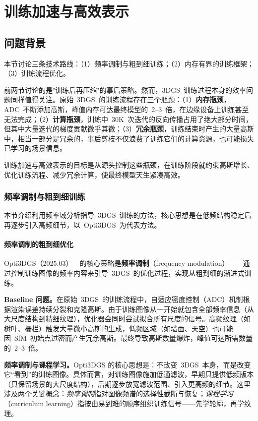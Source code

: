 \section{训练加速与高效表示}
\label{sec:11_3}

\subsection{问题背景}

本节讨论三条技术路线：（1）频率调制与粗到细训练；（2）内存有界的训练框架；（3）训练流程优化。

前两节讨论的是"训练后再压缩"的事后策略。然而，3DGS~训练过程本身的效率问题同样值得关注。原始~3DGS~的训练流程存在三个瓶颈：（1）\textbf{内存瓶颈}，ADC~不断添加高斯，峰值内存可达最终模型的~2--3~倍，在边缘设备上训练甚至无法完成；（2）\textbf{计算瓶颈}，训练中~30K~次迭代的反向传播占用了绝大部分时间，但其中大量迭代的梯度贡献微乎其微；（3）\textbf{冗余瓶颈}，训练结束时产生的大量高斯中，相当一部分是冗余的，事后剪枝不仅浪费了训练它们的计算资源，也可能损失已学习的场景信息。

训练加速与高效表示的目标是从源头控制这些瓶颈，在训练阶段就约束高斯增长、优化训练流程、减少冗余计算，使最终模型天生紧凑高效。

\subsubsection{频率调制与粗到细训练}

本节介绍利用频率域分析指导~3DGS~训练的方法，核心思想是在低频结构稳定后再逐步引入高频细节，以~Opti3DGS~为代表方法。

\paragraph{频率调制的粗到细优化}

Opti3DGS（2025.03）~\cite{2503_14475}~的核心策略是\textbf{频率调制}（frequency modulation）——通过控制训练图像的频率内容来引导~3DGS~的优化过程，实现从粗到细的渐进式训练。

\textbf{Baseline 问题。}在原始~3DGS~的训练流程中，自适应密度控制（ADC）机制根据渲染误差持续分裂和克隆高斯。由于训练图像从一开始就包含全部频率信息（从大尺度结构到精细纹理），优化器会同时尝试拟合所有尺度的信号。高频纹理（如树叶、栅栏）触发大量微小高斯的生成，低频区域（如墙面、天空）也可能因~SfM~初始点过密而产生冗余高斯。最终导致高斯数量爆炸，峰值可达所需数量的~2--3~倍。

\textbf{频率调制与课程学习。}Opti3DGS 的核心思想是：不改变~3DGS~本身，而是改变它``看到''的训练图像。具体而言，对训练图像施加低通滤波，早期只提供低频版本（只保留场景的大尺度结构），后期逐步放宽滤波范围、引入更高频的细节。这里涉及两个关键概念：\emph{频率调制}指对图像频谱的选择性截断与恢复；\emph{课程学习}（curriculum learning）指按由易到难的顺序组织训练信号——先学轮廓，再学纹理。

